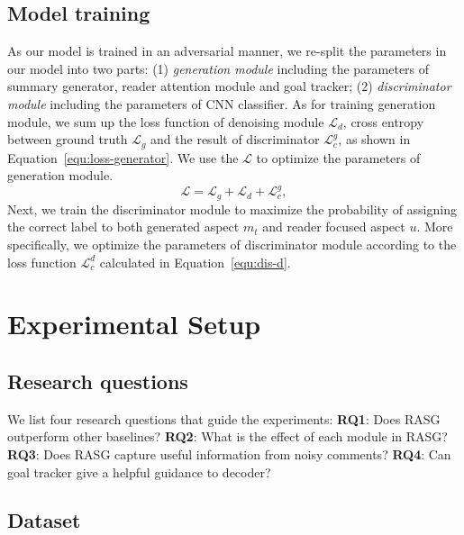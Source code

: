 \documentclass[letterpaper]{article}
\begin{document}
\subsection{Model training}

As our model is trained in an adversarial manner, we re-split the parameters in our model into two parts: (1) \textit{generation module} including the parameters of summary generator, reader attention module and goal tracker; (2) \textit{discriminator module} including the parameters of CNN classifier.
As for training generation module, we sum up the loss function of denoising module $\mathcal{L}_d$, cross entropy between ground truth $\mathcal{L}_g$ and the result of discriminator $\mathcal{L}^g_c$, as shown in Equation~\ref{equ:loss-generator}.
We use the $\mathcal{L}$ to optimize the parameters of generation module.
\begin{equation}
    \mathcal{L} = \mathcal{L}_g + \mathcal{L}_d + \mathcal{L}^g_c , \label{equ:loss-generator}
\end{equation}
Next, we train the discriminator module to maximize the probability of assigning the correct label to both generated aspect $m_t$ and reader focused aspect $u$.
More specifically, we optimize the parameters of discriminator module according to the loss function $\mathcal{L}^d_c$ calculated in Equation~\ref{equ:dis-d}.

\section{Experimental Setup}

\subsection{Research questions}

We list four research questions that guide the experiments:
\noindent \textbf{RQ1}: Does RASG outperform other baselines?
\noindent \textbf{RQ2}: What is the effect of each module in RASG?
\noindent \textbf{RQ3}: Does RASG capture useful information from noisy comments?
\noindent \textbf{RQ4}: Can goal tracker give a helpful guidance to decoder?

\subsection{Dataset}
\end{document}
